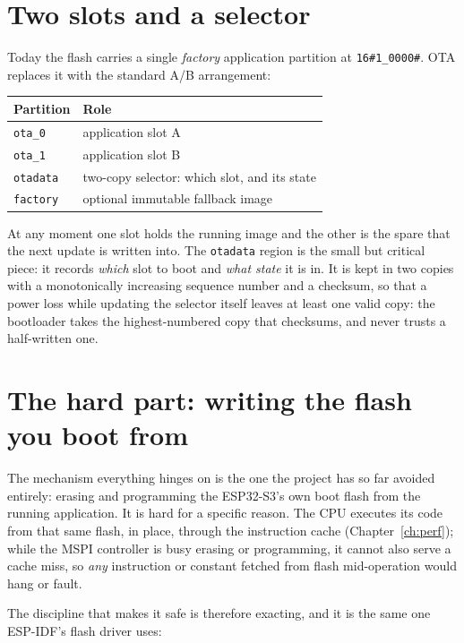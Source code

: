\section{Two slots and a selector}

Today the flash carries a single \emph{factory} application partition at
\texttt{16\#1\_0000\#}. OTA replaces it with the standard A/B arrangement:

\begin{center}
\begin{tabular}{l l}
\toprule
\textbf{Partition} & \textbf{Role} \\ \midrule
\texttt{ota\_0}   & application slot A \\
\texttt{ota\_1}   & application slot B \\
\texttt{otadata}  & two-copy selector: which slot, and its state \\
\texttt{factory}  & optional immutable fallback image \\
\bottomrule
\end{tabular}
\end{center}

At any moment one slot holds the running image and the other is the spare that the
next update is written into. The \texttt{otadata} region is the small but critical
piece: it records \emph{which} slot to boot and \emph{what state} it is in. It is
kept in two copies with a monotonically increasing sequence number and a checksum,
so that a power loss while updating the selector itself leaves at least one valid
copy: the bootloader takes the highest-numbered copy that checksums, and never
trusts a half-written one.

\section{The hard part: writing the flash you boot from}

The mechanism everything hinges on is the one the project has so far avoided
entirely: erasing and programming the ESP32-S3's own boot flash from the running
application. It is hard for a specific reason. The CPU executes its code from that
same flash, in place, through the instruction cache (Chapter~\ref{ch:perf}); while
the MSPI controller is busy erasing or programming, it cannot also serve a cache
miss, so \emph{any} instruction or constant fetched from flash mid-operation would
hang or fault.

The discipline that makes it safe is therefore exacting, and it is the same one
ESP-IDF's flash driver uses:

